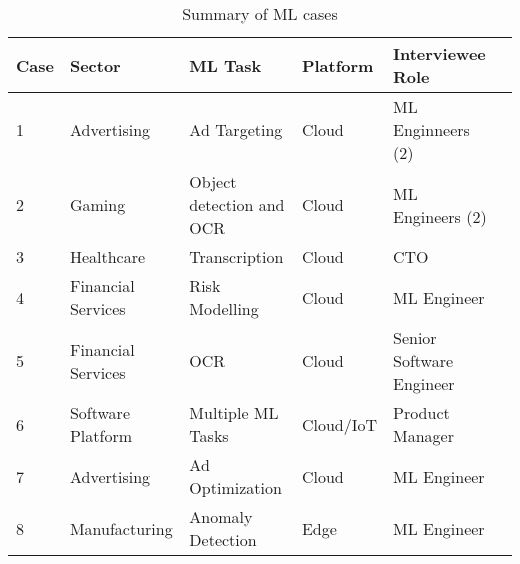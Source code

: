 
\begin{table}
  \caption{Summary of ML cases}
    \begin{tabular}{lp{3cm}p{3.5cm}p{2.0cm}p{3.2cm}l} 
        \textbf{Case} & \textbf{Sector} & \textbf{ML Task} & \textbf{Platform} & \textbf{Interviewee Role}\\ 
        \hline
        1 &  Advertising       & Ad Targeting    & Cloud & ML Enginneers (2) \\ %
        2 &  Gaming     & Object detection and OCR   & Cloud  & ML Engineers (2) \\ %
        3 &  Healthcare    & Transcription & Cloud  & CTO\\ %
        4 &  Financial Services    & Risk Modelling & Cloud  & ML Engineer\\ %
        5 &  Financial Services    & OCR   & Cloud & Senior Software Engineer\\ %
        6 &  Software Platform & Multiple ML Tasks & Cloud/IoT & Product Manager\\ %
        7 &  Advertising & Ad Optimization  & Cloud & ML Engineer\\ %
        8 &  Manufacturing & Anomaly Detection & Edge & ML Engineer\\ %
        \hline    
        \end{tabular}
  \label{tab: ml_case_summary}
\end{table}